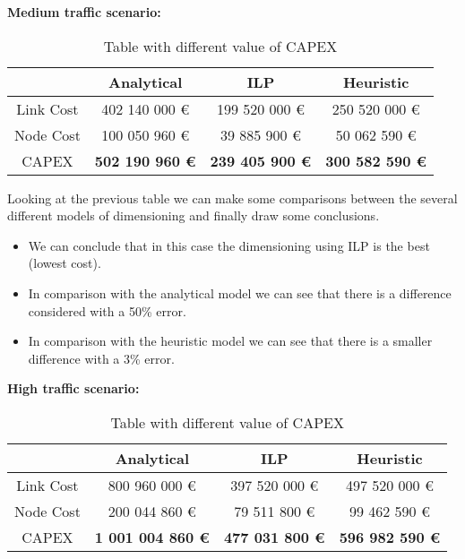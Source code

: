 \vspace{11pt}
\textbf{Medium traffic scenario:}

\begin{table}[h!]
\centering
\begin{tabular}{| c | c | c | c |}
 \hline
   & Analytical & ILP & Heuristic \\
 \hline\hline
 Link Cost & 402 140 000 \euro & 199 520 000 \euro & 250 520 000 \euro \\
 Node Cost & 100 050 960 \euro & 39 885 900 \euro & 50 062 590 \euro \\
 CAPEX & \textbf{502 190 960 \euro} & \textbf{239 405 900 \euro} & \textbf{300 582 590 \euro} \\
 \hline
\end{tabular}
\caption{Table with different value of CAPEX }
\label{table_comparative_opaque_protec_ref_2}
\end{table}

\vspace{11pt}
Looking at the previous table we can make some comparisons between the several different models of dimensioning and finally draw some conclusions.

\begin{itemize}
  \item We can conclude that in this case the dimensioning using ILP is the best (lowest cost).
  \item In comparison with the analytical model we can see that there is a difference considered with a 50\% error.
  \item In comparison with the heuristic model we can see that there is a smaller difference with a 3\% error.
\end{itemize}


\vspace{11pt}
\textbf{High traffic scenario:}\\

\begin{table}[h!]
\centering
\begin{tabular}{| c | c | c | c |}
 \hline
   & Analytical & ILP & Heuristic \\
 \hline\hline
 Link Cost & 800 960 000 \euro & 397 520 000 \euro & 497 520 000 \euro \\
 Node Cost & 200 044 860 \euro & 79 511 800 \euro & 99 462 590 \euro \\
 CAPEX & \textbf{1 001 004 860 \euro} & \textbf{477 031 800 \euro} & \textbf{596 982 590 \euro} \\
 \hline
\end{tabular}
\caption{Table with different value of CAPEX }
\label{table_comparative_opaque_protec_ref_3}
\end{table}

